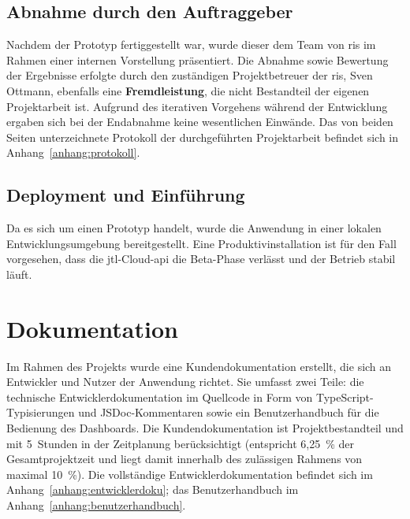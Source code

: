 \documentclass[11pt, a4paper, oneside]{report}
\begin{document}
\section{Abnahme durch den Auftraggeber}

Nachdem der Prototyp fertiggestellt war, wurde dieser dem Team von \gls{ris} im
Rahmen einer internen Vorstellung präsentiert. Die Abnahme sowie Bewertung der Ergebnisse erfolgte durch den zuständigen
Projektbetreuer der \gls{ris}, Sven Ottmann,
ebenfalls eine \textbf{Fremdleistung}, die nicht Bestandteil der eigenen
Projektarbeit ist. Aufgrund des iterativen Vorgehens während der Entwicklung
ergaben sich bei der Endabnahme keine wesentlichen Einwände. Das von beiden Seiten
unterzeichnete Protokoll der durchgeführten Projektarbeit befindet sich in
Anhang~\ref{anhang:protokoll}.

\section{Deployment und Einführung}

Da es sich um einen Prototyp handelt, wurde die Anwendung in einer lokalen
Entwicklungsumgebung bereitgestellt. Eine Produktivinstallation ist für den Fall
vorgesehen, dass die \gls{jtl}-Cloud-\gls{api} die Beta-Phase verlässt und der
Betrieb stabil läuft.

\chapter{Dokumentation}

Im Rahmen des Projekts wurde eine Kundendokumentation erstellt, die sich an
Entwickler und Nutzer der Anwendung richtet. Sie umfasst zwei Teile:
die technische Entwicklerdokumentation im Quellcode in Form von
TypeScript-Typisierungen und JSDoc-Kommentaren sowie ein Benutzerhandbuch für die
Bedienung des Dashboards. Die Kundendokumentation ist Projektbestandteil und mit
5~Stunden in der Zeitplanung berücksichtigt (entspricht 6{,}25~\% der
Gesamtprojektzeit und liegt damit innerhalb des zulässigen Rahmens von maximal
10~\%). Die vollständige Entwicklerdokumentation befindet sich im
Anhang~\ref{anhang:entwicklerdoku}; das Benutzerhandbuch im
Anhang~\ref{anhang:benutzerhandbuch}.

\end{document}
